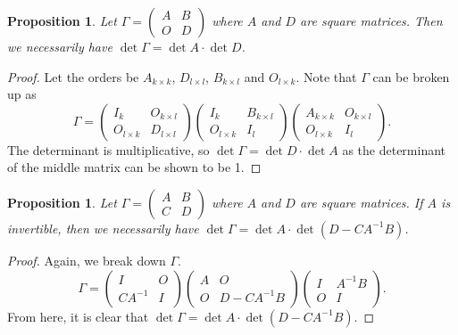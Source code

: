 \documentclass[15pt,a4paper]{book}
\newtheorem{proposition}[theorem]{Proposition}
\theoremstyle{definition}
\begin{document}
\begin{proposition}
    Let $\Gamma = \begin{pmatrix}
        A & B \\ O & D
    \end{pmatrix}$ where $A$ and $D$ are square matrices. Then we necessarily have $\det \Gamma = \det{A} \cdot \det{D}$.
\end{proposition}
\begin{proof}
    Let the orders be $A_{k \times k}$, $D_{l \times l}$, $B_{k \times l}$ and $O_{l \times k}$. Note that $\Gamma$ can be broken up as
    \begin{equation}
        \Gamma = \begin{pmatrix}
            I_{k} & O_{k \times l} \\
            O_{l \times k} & D_{l \times l}
        \end{pmatrix} \begin{pmatrix}
            I_{k} & B_{k \times l} \\
            O_{l \times k} & I_{l}
        \end{pmatrix} \begin{pmatrix}
            A_{k \times k} & O_{k \times l} \\
            O_{l \times k} & I_{l}
        \end{pmatrix}.
    \end{equation}
    The determinant is multiplicative, so $\det \Gamma = \det D \cdot \det A$ as the determinant of the middle matrix can be shown to be 1.
\end{proof}

\begin{proposition}
    Let $\Gamma = \begin{pmatrix}
        A & B \\ C & D
    \end{pmatrix}$ where $A$ and $D$ are square matrices. If $A$ is invertible, then we necessarily have $\det \Gamma = \det A \cdot \det (D - CA^{-1}B)$.
\end{proposition}
\begin{proof}
    Again, we break down $\Gamma$.
    \begin{equation}
        \Gamma = \begin{pmatrix}
            I & O \\ CA^{-1} & I
        \end{pmatrix} \begin{pmatrix}
            A & O \\ O & D-CA^{-1}B
        \end{pmatrix} \begin{pmatrix}
            I & A^{-1}B \\ O & I
        \end{pmatrix}.
    \end{equation}
    From here, it is clear that $\det \Gamma = \det{A} \cdot \det(D-CA^{-1}B)$.
\end{proof}
\end{document}
